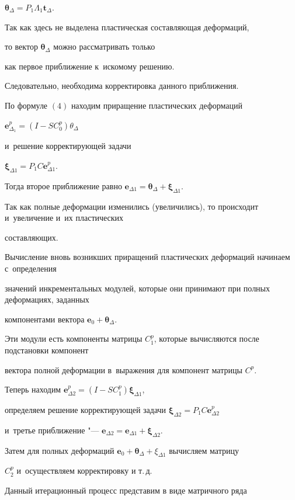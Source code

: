 $\boldsymbol{\theta}_\Delta=P_1 \Lambda_1 \boldsymbol{t}_\Delta$.

Так как здесь не выделена пластическая составляющая деформаций,

то вектор $\boldsymbol{\theta}_\Delta$ можно рассматривать только

как первое приближение к~искомому решению.

Следовательно, необходима корректировка данного приближения.

По формуле $(4)$ находим приращение пластических деформаций

$\boldsymbol{e}^p_{\Delta_1}=\left(I-SC^p_0\right)\theta_\Delta$

и~решение корректирующей задачи

$\boldsymbol{\xi}_{\Delta 1}=P_1 C \boldsymbol{e}^p_{\Delta 1}$.

Тогда второе приближение равно $\boldsymbol{e}_{\Delta 1}=\boldsymbol{\theta}_\Delta+\boldsymbol{\xi}_{\Delta 1}$.

Так как полные деформации изменились (увеличились), то происходит и~увеличение и~их пластических

составляющих.

Вычисление вновь возникших приращений пластических деформаций начинаем с~определения

значений инкрементальных модулей, которые они принимают при полных деформациях, заданных

компонентами вектора $\boldsymbol{e}_0+\boldsymbol{\theta}_\Delta$.

Эти модули есть компоненты матрицы $C_1^p$, которые вычисляются после подстановки компонент

вектора полной деформации в~выражения для компонент матрицы $C^p$.

Теперь находим $\boldsymbol{e}_{\Delta 2}^p=\left(I-SC^p_1\right)\boldsymbol{\xi}_{\Delta 1}$,

определяем решение корректирующей задачи $\boldsymbol{\xi}_{\Delta 2}=P_1 C \boldsymbol{e}^p_{\Delta2}$

и~третье приближение "--- $\boldsymbol{e}_{\Delta 2}=\boldsymbol{e}_{\Delta 1}+\boldsymbol{\xi}_{\Delta 2}$.

Затем для полных деформаций $\boldsymbol{e}_0+\boldsymbol{\theta}_\Delta+\xi_{\Delta 1}$  вычисляем матрицу

$C^p_2$  и~осуществляем корректировку и т.\,д.

Данный итерационный процесс представим в виде матричного ряда

